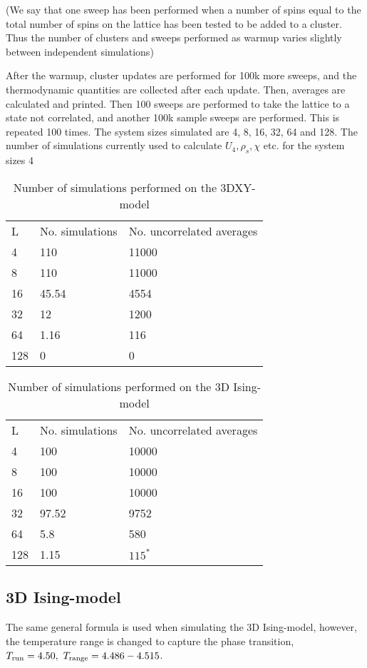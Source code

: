 (We say that one sweep has been performed when a number of spins equal to the total number of spins on the lattice has been tested to be added to a cluster.
Thus the number of clusters and sweeps performed as warmup varies slightly between independent simulations)

After the warmup, cluster updates are performed for 100k more sweeps, and the thermodynamic quantities are collected after each update. Then, averages are calculated and printed. Then 100 sweeps are performed to take the lattice to a state not correlated, and another 100k sample sweeps are performed. This is repeated 100 times. The system sizes simulated are 4, 8, 16, 32, 64 and 128. 
The number of simulations currently used to calculate $U_4, \rho_s, \chi $ etc. for the system sizes 4


\begin{table}[htpb]
\begin{center}
\begin{tabular}{l l l}
  L & No. simulations & No. uncorrelated averages\\
  4 & 110 & 11000\\
  8 & 110 & 11000\\
  16 & 45.54 & 4554\\
  32 & 12 & 1200\\
  64 & 1.16 & 116 \\
  128 & 0  & 0 \\
\end{tabular}
\end{center}
\caption{Number of simulations performed on the 3DXY-model}
\end{table}

\begin{table}[htpb]
\begin{center}
\begin{tabular}{l l l}
  L & No. simulations & No. uncorrelated averages\\
  4 & 100 & 10000\\
  8 & 100 & 10000\\
  16 & 100 & 10000\\
  32 & 97.52 & 9752 \\
  64 & 5.8 & 580 \\
  128 & 1.15  & $115^{*}$ \\
\end{tabular}
\end{center}
\caption{Number of simulations performed on the 3D Ising-model}
\end{table}
\subsection{3D Ising-model}
The same general formula is used when simulating the 3D Ising-model, however, the temperature range is changed to capture the phase transition, $T_{\textrm{run}} = 4.50, ~ T_{\textrm{range}} = 4.486-4.515$.



%



